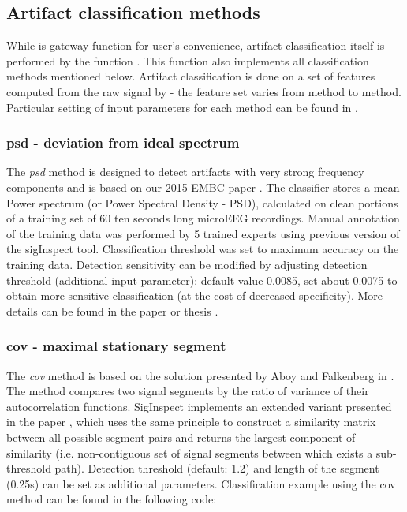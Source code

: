 \documentclass[a4paper,10pt]{article}
\begin{document}
\subsection{Artifact classification methods}
While  is gateway function for user's convenience, artifact classification itself is performed by the function  . This function also implements all classification methods mentioned below. Artifact classification is done on a set of features computed from the raw signal by  - the feature set varies from method to method. Particular setting of input parameters for each method can be found in .

\subsubsection{psd - deviation from ideal spectrum}
The \emph{psd} method is designed to detect artifacts with very strong frequency components and is based on our 2015 EMBC paper \cite{Bakstein2015}. The classifier stores a mean Power spectrum (or Power Spectral Density - PSD), calculated on clean portions of a training set of 60 ten seconds long microEEG recordings. Manual annotation of the training data was performed by 5 trained experts using previous version of the sigInspect tool. Classification threshold was set to maximum accuracy on the training data. Detection sensitivity can be modified by adjusting detection threshold (additional input parameter): default value 0.0085, set about 0.0075 to obtain more sensitive classification (at the cost of decreased specificity). More details can be found in the paper \cite{Bakstein2015} or thesis \cite{Bakstein2016}. 

\subsubsection{cov - maximal stationary segment}
The \emph{cov} method is based on the solution presented by Aboy and Falkenberg in \cite{Falkenberg2003, Aboy2006}. The method compares two signal segments by the ratio of variance of their autocorrelation functions. SigInspect implements an extended variant presented in the paper \cite{Bakstein2015}, which uses the same principle to construct a similarity matrix between all possible segment pairs and returns the largest component of similarity (i.e. non-contiguous set of signal segments between which exists a sub-threshold path). Detection threshold (default: 1.2) and length of the segment (0.25s) can be set as additional parameters. Classification example using the cov method can be found in the following code:
\end{document}
